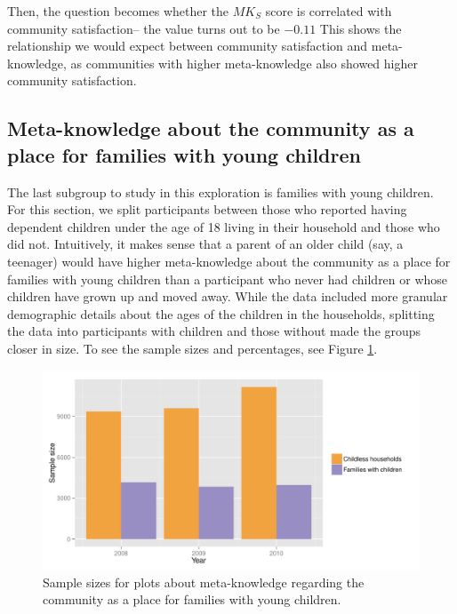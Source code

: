 \documentclass[smallextended]{svjour3}\usepackage[]{graphicx}\usepackage[]{color}
\newenvironment{knitrout}{}{} %
\begin{document}
Then, the question becomes whether the $MK_S$ score is correlated with community satisfaction-- the value turns out to be \ensuremath{-0.11} This shows the relationship we would expect between community satisfaction and meta-knowledge, as communities with higher meta-knowledge also showed higher community satisfaction. 


\subsection{Meta-knowledge about the community as a place for families with young children}
The last subgroup to study in this exploration is families with young children. For this section, we split participants between those who reported having dependent children under the age of 18 living in their household and those who did not. Intuitively, it makes sense that a parent of an older child (say, a teenager) would have higher meta-knowledge about the community as a place for families with young children than a participant who never had children or whose children have grown up and moved away. While the data included more granular demographic details about the ages of the children in the households, splitting the data into participants with children and those without made the groups closer in size. To see the sample sizes and percentages, see Figure \ref{fig:kidsSS}. 



\begin{knitrout}
\color{fgcolor}\begin{figure}

{\centering \includegraphics[width=0.99\linewidth]{figure/kidsSS-1} 

}

\caption[Sample sizes for plots about meta-knowledge regarding the community as a place for families with young children]{Sample sizes for plots about meta-knowledge regarding the community as a place for families with young children.}\label{fig:kidsSS}
\end{figure}


\end{knitrout}
\end{document}
